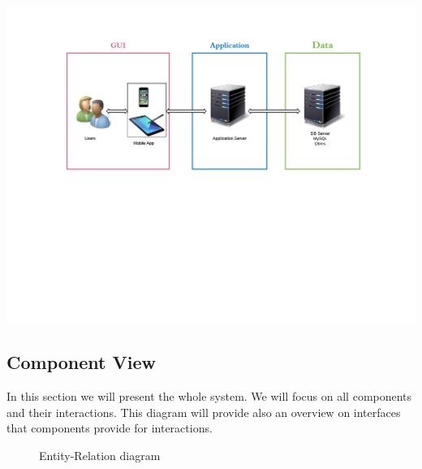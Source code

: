 \documentclass[12pt,titlepage]{article}
\begin{document}
\includegraphics[scale=0.5]{"General Architecture - Page 1"}
\pagebreak


\subsection{Component View}
In this section we will present the whole system. We will focus on all components and their interactions. This diagram will provide also an overview on interfaces that components provide for interactions.
\begin{figure}[H]
\centering
{}
\caption{Entity-Relation diagram}
\end{figure}
\end{document}
